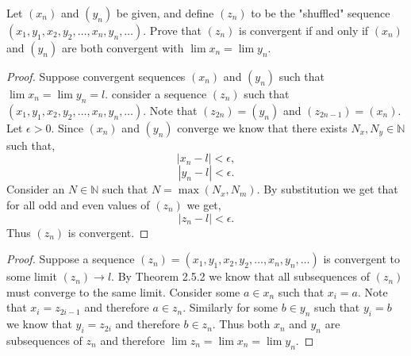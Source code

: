 \documentclass[12pt]{article}
\makeatletter
\theoremstyle{homework}
\newenvironment{exercise}[1]
{\def\@currentlabel{#1}\exercisecore}
{\endexercisecore}
\newcommand{\Nats}{\ensuremath{\mathbb N}}
\makeatother
\begin{document}
\begin{exercise} {4} Let $(x_n)$ and $(y_n)$ be given, and define $(z_n)$ to be the "shuffled"
  sequence $(x_1,y_1,x_2,y_2,\dots,x_n,y_n,\dots)$. Prove that $(z_n)$ is convergent if and only if 
  $(x_n)$ and $(y_n)$ are both convergent with $\lim x_n = \lim y_n$.\\

\begin{proof}
  Suppose convergent sequences $(x_n)$ and $(y_n)$ such that $\lim x_n = \lim y_n = l$. consider a sequence $(z_n)$ such that
  $(x_1,y_1,x_2,y_2,\dots,x_n,y_n,\dots)$. Note that $(z_{2n}) = (y_n)$ and $(z_{2n-1}) = (x_n)$. Let $\epsilon > 0$. Since 
  $(x_n)$ and $(y_n)$ converge we know that there exists $N_x,N_y \in \Nats$ such that,
  \begin{equation*}
    |x_n - l|<\epsilon,
  \end{equation*}
  \begin{equation*}
    |y_n - l|<\epsilon.
  \end{equation*}
  Consider an $N \in \Nats$ such that $N = \max(N_x,N_m)$. By substitution we get that for all odd and even values of $(z_n)$ we get,
  \begin{equation*}
    |z_n - l| < \epsilon.
  \end{equation*}
Thus $(z_n)$ is convergent. 
\end{proof}
\vspace{.25 in}

\begin{proof}
  Suppose a sequence $(z_n) =(x_1,y_1,x_2,y_2,\dots,x_n,y_n,\dots)$ is convergent to some limit $(z_n) \to l$. By Theorem 2.5.2
  we know that all subsequences of $(z_n)$ must converge to the same limit. Consider some $a \in x_n$ such that $x_i = a$. Note that $x_i = z_{2i-1}$
  and therefore $a \in z_n$. Similarly for some $b \in y_n$ such that $y_i = b$ we know that $y_i = z_{2i}$ and therefore $b \in z_n$. Thus both $x_n$ and $y_n$
  are subsequences of $z_n$ and therefore $\lim z_n = \lim x_n = \lim y_n$.
\end{proof}

\end{exercise}
\vspace{.5in}
\end{document}
